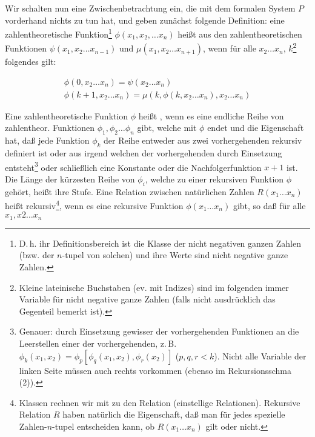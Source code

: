 \documentclass[draft]{scrartcl}
\begin{document}
\label{zwischenbetrachtungrekursion}
Wir schalten nun eine Zwischenbetrachtung ein, die mit dem
formalen System $P$ vorderhand nichts zu tun hat, und
geben zunächst folgende Definition: eine zahlentheoretische
Funktion\footnote{D.\,h. ihr Definitionsbereich ist die
Klasse der nicht negativen ganzen Zahlen (bzw. der $n$-tupel
von solchen) und ihre Werte sind nicht negative ganze Zahlen.}
$\phi\left(x_1, x_2, \dots x_n\right)$ heißt 
aus den zahlentheoretischen Funktionen
$\psi\left(x_1, x_2 \dots x_{n - 1}\right)$ und $\mu\left(x_1, x_2 \dots x_{n + 1}\right)$, wenn
für alle $x_2 \dots x_n$, $k$\footnote{Kleine lateinische Buchstaben (ev.
mit Indizes) sind im folgenden immer Variable für nicht negative
ganze Zahlen (falls nicht ausdrücklich das Gegenteil bemerkt ist).}
folgendes gilt:

\begin{equation}
	\begin{aligned}
		\phi\left(0, x_2 \dots x_n\right) =  \psi\left(x_2 \dots x_n\right)\\
		\phi\left(k + 1, x_2 \dots x_n\right) = \mu\left(k, \phi\left(k, x_2 \dots x_n\right), x_2 \dots x_n\right)
	\end{aligned}
\end{equation}

Eine zahlentheoretische Funktion $\phi$ heißt
, wenn es eine endliche Reihe von zahlentheor.
Funktionen $\phi_1, \phi_2 \dots \phi_n$ gibt, welche
mit $\phi$ endet und die Eigenschaft hat, daß jede
Funktion $\phi_k$ der Reihe entweder aus zwei
vorhergehenden rekursiv definiert ist oder aus irgend
welchen der vorhergehenden durch Einsetzung
entsteht\footnote{Genauer: durch Einsetzung gewisser der vorhergehenden
Funktionen an die Leerstellen einer der vorhergehenden, z.\,B. $\phi_k\left(x_1, x_2\right) = \phi_p\left[\phi_q\left(x_1, x_2\right), \phi_r\left(x_2\right)\right]$ ($p, q, r < k$). Nicht alle Variable der linken Seite müssen auch rechts vorkommen (ebenso im Rekursionsschma (2)).}
oder schließlich eine Konstante oder die Nachfolgerfunktion
$x + 1$ ist. Die Länge der kürzesten Reihe von $\phi_i$,
welche zu einer rekursiven Funktion $\phi$ gehört,
heißt ihre Stufe. Eine Relation zwischen natürlichen
Zahlen $R\left(x_1 \dots x_n\right)$ heißt
rekursiv\footnote{Klassen rechnen wir mit zu den
Relation (einstellige Relationen). Rekursive Relation
$R$ haben natürlich die Eigenschaft, daß man für
jedes spezielle Zahlen-$n$-tupel entscheiden kann,
ob $R\left(x_1 \dots x_n\right)$ gilt oder nicht.},
wenn es eine rekursive Funktion $\phi\left(x_1 \dots x_n\right)$ gibt,
so daß für alle $x_1, x2 \dots x_n$
\end{document}
